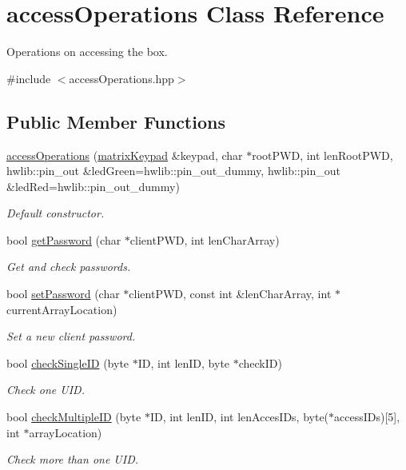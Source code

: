 \hypertarget{classaccess_operations}{}\section{access\+Operations Class Reference}
\label{classaccess_operations}


Operations on accessing the box.  




{\ttfamily \#include $<$access\+Operations.\+hpp$>$}

\subsection*{Public Member Functions}
\begin{DoxyCompactItemize}
\item 
\hyperlink{classaccess_operations_a42622d8277e50d7e01118139ab2fd57e}{access\+Operations} (\hyperlink{classmatrix_keypad}{matrix\+Keypad} \&keypad, char $\ast$root\+P\+WD, int len\+Root\+P\+WD, hwlib\+::pin\+\_\+out \&led\+Green=hwlib\+::pin\+\_\+out\+\_\+dummy, hwlib\+::pin\+\_\+out \&led\+Red=hwlib\+::pin\+\_\+out\+\_\+dummy)
\begin{DoxyCompactList}\small\item\em Default constructor. \end{DoxyCompactList}\item 
bool \hyperlink{classaccess_operations_a23a9545b9b8636b995aa6e3d007ea524}{get\+Password} (char $\ast$client\+P\+WD, int len\+Char\+Array)
\begin{DoxyCompactList}\small\item\em Get and check passwords. \end{DoxyCompactList}\item 
bool \hyperlink{classaccess_operations_a93b1c64a9598739a34c09757fe1f4ac1}{set\+Password} (char $\ast$client\+P\+WD, const int \&len\+Char\+Array, int $\ast$current\+Array\+Location)
\begin{DoxyCompactList}\small\item\em Set a new client password. \end{DoxyCompactList}\item 
bool \hyperlink{classaccess_operations_a44956d25fa01c97b6755fbbc30fa7bf7}{check\+Single\+ID} (byte $\ast$ID, int len\+ID, byte $\ast$check\+ID)
\begin{DoxyCompactList}\small\item\em Check one U\+ID. \end{DoxyCompactList}\item 
bool \hyperlink{classaccess_operations_aa1967ef877d37bf37721cde1e41665b0}{check\+Multiple\+ID} (byte $\ast$ID, int len\+ID, int len\+Acces\+I\+Ds, byte($\ast$access\+I\+Ds)\mbox{[}5\mbox{]}, int $\ast$array\+Location)
\begin{DoxyCompactList}\small\item\em Check more than one U\+ID. \end{DoxyCompactList}\end{DoxyCompactItemize}


